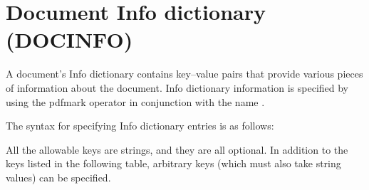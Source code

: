 \documentclass[letterpaper,12pt,english,openany,oneside]{sphinxmanual}
\begin{document}
\begin{sphinxVerbatim}[commandchars=\\\{\}]
       

\PYG{p}{[}        
           
\end{sphinxVerbatim}


\section{Document Info dictionary (DOCINFO)}
\label{\detokenize{pdfmark_Basic:document-info-dictionary-docinfo}}
A document’s Info dictionary contains key–value pairs that provide various pieces of information about the document. Info dictionary information is specified by using the pdfmark operator in conjunction with the name  .

The syntax for specifying Info dictionary entries is as follows:

\begin{sphinxVerbatim}[commandchars=\\\{\}]
 \PYG{p}{[} 
















         
\end{sphinxVerbatim}

All the allowable keys are strings, and they are all optional. In addition to the keys listed in the following table, arbitrary keys (which must also take string values) can be specified.
\end{document}
